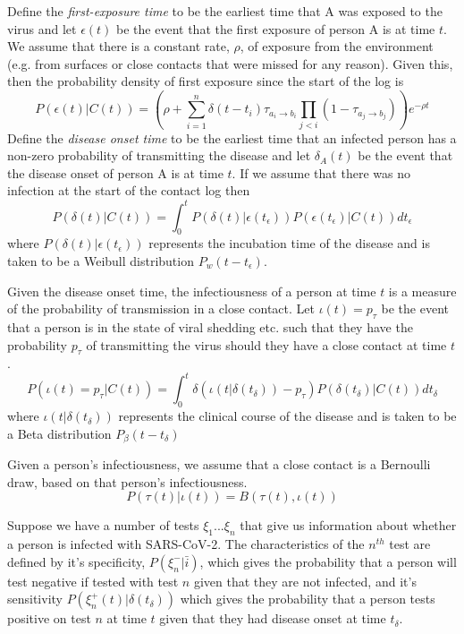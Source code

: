 \documentclass{article}
\begin{document}
Define the \textit{first-exposure time} to be the earliest time that A was exposed to the virus and let $\epsilon(t)$ be the event that the first exposure of person A is at time $t$. We assume that there is a constant rate, $\rho$, of exposure from the environment (e.g. from surfaces or close contacts that were missed for any reason). Given this, then the probability density of first exposure since the start of the log is
\[
P\left(\epsilon(t)|C(t)\right) = \left(\rho + \sum_{i=1}^n \delta(t - t_i)\tau_{a_i\rightarrow b_i} \prod_{j<i}(1-\tau_{a_j\rightarrow b_j})\right) e^{-\rho t}
\] 
Define the \textit{disease onset time} to be the earliest time that an infected person has a non-zero probability of transmitting the disease and let $\delta_A(t)$ be the event that the disease onset of person A is at time $t$. If we assume that there was no infection at the start of the contact log then
\[
P(\delta(t)|C(t)) = \int_0^{t} P(\delta(t)|\epsilon(t_\epsilon))P(\epsilon(t_\epsilon)|C(t)) dt_\epsilon
\]
where $P(\delta(t)|\epsilon(t_\epsilon))$ represents the incubation time of the disease and is taken to be a Weibull distribution $P_w(t-t_\epsilon)$.

Given the disease onset time, the infectiousness of a person at time $t$ is a measure of the probability of transmission in a close contact. Let $\iota(t) = p_\tau$ be the event that a person is in the state of viral shedding etc. such that they have the probability $p_\tau$ of transmitting the virus should they have a close contact at time $t$.
\[
P(\iota(t) = p_\tau|C(t)) = \int_0^t \delta(\iota(t|\delta(t_\delta))-p_\tau)P(\delta(t_\delta)|C(t)) dt_\delta
\]
where $\iota(t|\delta(t_\delta))$ represents the clinical course of the disease and is taken to be a Beta distribution $P_\beta(t-t_\delta)$

Given a person's infectiousness, we assume that a close contact is a Bernoulli draw, based on that person's infectiousness.
\[
P(\tau(t)|\iota(t)) = B(\tau(t), \iota(t))
\]

Suppose we have a number of tests $\xi_1...\xi_n$ that give us information about whether a person is infected with SARS-CoV-2. The characteristics of the $n^{th}$ test are defined by it's specificity, $P(\xi^-_n|\bar{i})$, which gives the probability that a person will test negative if tested with test $n$ given that they are not infected, and it's sensitivity $P(\xi^+_n(t)|\delta(t_\delta))$ which gives the probability that a person tests positive on test $n$ at time $t$ given that they had disease onset at time $t_\delta$.
\end{document}
